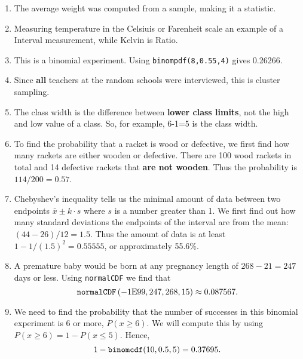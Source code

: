 \documentclass{article}
\newcommand{\answer}[1]{{\color{red}{\large \textbf{#1}}}}
\begin{document}
\pagestyle{myheadings}

\begin{center}
\textbf{}
\end{center}

\begin{enumerate}

\item \answer{B} The average weight was computed from a sample, making it a statistic.

\item \answer{C} Measuring temperature in the Celsiuis or Farenheit scale an example of a Interval measurement, while Kelvin is Ratio.

\item \answer{B} This is a binomial experiment. Using \texttt{binompdf(8,0.55,4)} gives 0.26266.

\item \answer{B} Since {\bf all} teachers at the random schools were interviewed, this is cluster sampling.

\item \answer{B} The class width is the difference between {\bf lower class limits}, not the high and low value of a class. So, for example, 6-1=5 is the class width.

\item \answer{B} To find the probability that a racket is wood or defective, we first find how many rackets are either wooden or defective. There are 100 wood rackets in total and 14 defective rackets that {\bf are not wooden}. Thus the probability is $114/200=0.57$.

\item \answer{A} Chebyshev's inequality tells us the minimal amount of data between two endpoints $\bar{x} \pm k\cdot s$ where $s$ is a number greater than 1. We first find out how many standard deviations the endpoints of the interval are from the mean: $(44-26)/12=1.5$. Thus the amount of data is at least $1-1/(1.5)^2 = 0.55555$, or approximately 55.6\%.

\item \answer{C} A premature baby would be born at any pregnancy length of $268-21=247$ days or less. Using \texttt{normalCDF} we find that 
$$\mbox{\texttt{normalCDF}}\left(-1\mbox{E}99, 247, 268, 15 \right) \approx 0.087567.$$

\item \answer{B} We need to find the probability that the number of successes in this binomial experiment is 6 or more, $P(x\geq 6)$. We will compute this by using $P(x\geq 6) = 1 - P(x\leq 5)$. Hence, $$1-\mbox{\texttt{binomcdf}}(10, 0.5, 5) = 0.37695.$$


\end{enumerate}
\end{document}
